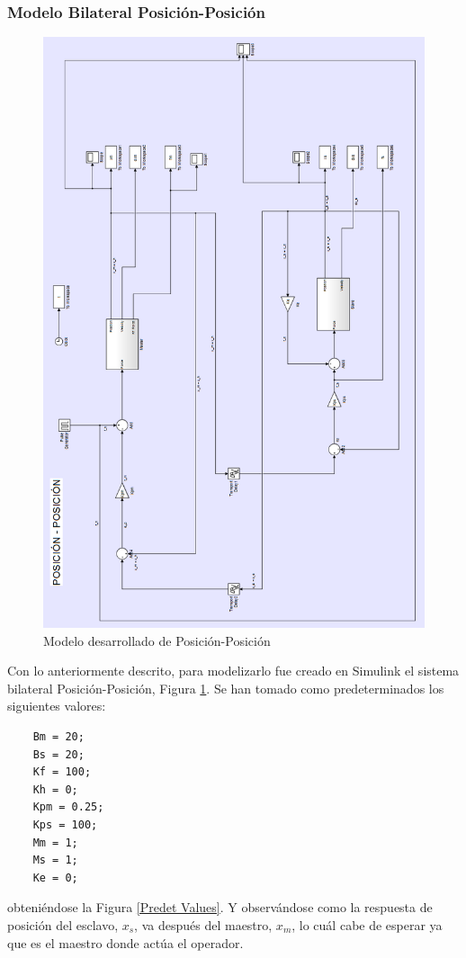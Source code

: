 \documentclass[a4paper, fontsize=11pt]{scrartcl} %
\numberwithin{equation}{section} %
\numberwithin{figure}{section} %
\numberwithin{table}{section} %
\begin{document}
	\subsubsection{Modelo Bilateral Posición-Posición}
	
	\begin{figure}[h!]
		\centering
		\includegraphics[height=1.42\linewidth]{images/Model_POS-POS.PNG}
		\caption{Modelo desarrollado de Posición-Posición}
		\label{Model Position-Position}
	\end{figure}
	\FloatBarrier
	
	Con lo anteriormente descrito, para modelizarlo fue creado en Simulink el sistema bilateral Posición-Posición, Figura \ref{Model Position-Position}. Se han tomado como predeterminados los siguientes valores:
	
	\begin{lstlisting}
	Bm = 20;
	Bs = 20;
	Kf = 100;
	Kh = 0;
	Kpm = 0.25;
	Kps = 100;
	Mm = 1;
	Ms = 1;
	Ke = 0;
	\end{lstlisting}
	\label{Predet1}
	obteniéndose la Figura \ref{Predet Values}. Y observándose como la respuesta de posición del esclavo, $x_s$, va después del maestro, $x_m$, lo cuál cabe de esperar ya que es el maestro donde actúa el operador.\\
	
\end{document}
